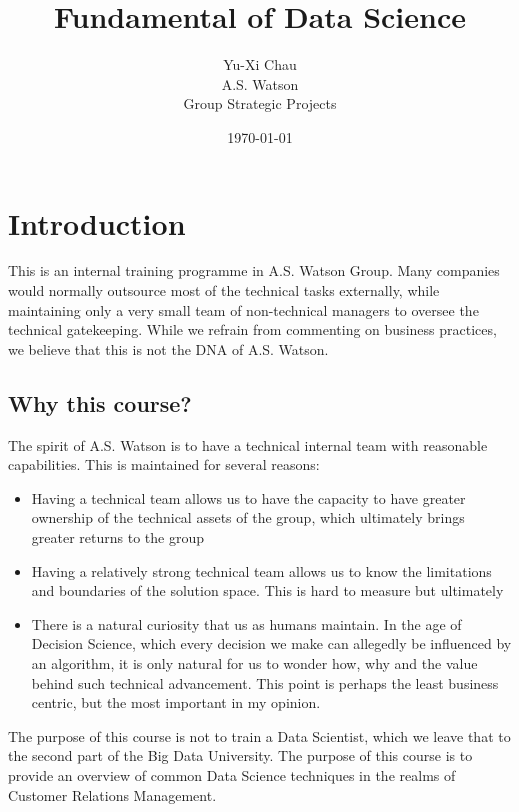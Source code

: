 \documentclass[10pt, a4paper, titlepage]{article}
\title{Fundamental of Data Science}
\author{Yu-Xi Chau\\
	A.S. Watson\\
	Group Strategic Projects
	}
\date{\today}
\begin{document}
\maketitle

\tableofcontents %
\newpage

\section{Introduction}

This is an internal training programme in A.S. Watson Group.  Many companies would normally outsource most of the technical tasks externally, while maintaining only a very small team of non-technical managers to oversee the technical gatekeeping.  While we refrain from commenting on business practices, we believe that this is not the DNA of A.S. Watson.  

\subsection{Why this course?}

The spirit of A.S. Watson is to have a technical internal team with reasonable capabilities.  This is maintained for several reasons:

\begin{itemize}
\item Having a technical team allows us to have the capacity to have greater ownership of the technical assets of the group, which ultimately brings greater returns to the group
\item Having a relatively strong technical team allows us to know the limitations and boundaries of the solution space.  This is hard to measure but ultimately 
\item There is a natural curiosity that us as humans maintain.  In the age of Decision Science, which every decision we make can allegedly be influenced by an algorithm, it is only natural for us to wonder how, why and the value behind such technical advancement.  This point is perhaps the least business centric, but the most important in my opinion.  
\end{itemize}

The purpose of this course is not to train a Data Scientist, which we leave that to the second part of the Big Data University.  The purpose of this course is to provide an overview of common Data Science techniques in the realms of Customer Relations Management.  
\end{document}
